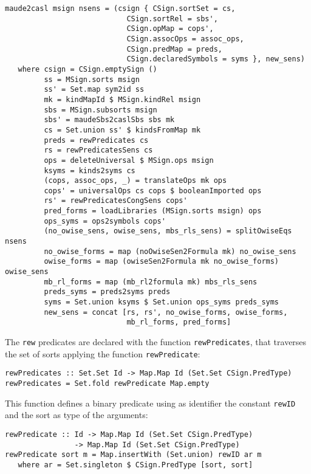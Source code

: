 {\codesize
\begin{verbatim}
maude2casl msign nsens = (csign { CSign.sortSet = cs,
                            CSign.sortRel = sbs',
                            CSign.opMap = cops',
                            CSign.assocOps = assoc_ops,
                            CSign.predMap = preds,
                            CSign.declaredSymbols = syms }, new_sens)
   where csign = CSign.emptySign ()
         ss = MSign.sorts msign
         ss' = Set.map sym2id ss
         mk = kindMapId $ MSign.kindRel msign
         sbs = MSign.subsorts msign
         sbs' = maudeSbs2caslSbs sbs mk
         cs = Set.union ss' $ kindsFromMap mk
         preds = rewPredicates cs
         rs = rewPredicatesSens cs
         ops = deleteUniversal $ MSign.ops msign
         ksyms = kinds2syms cs
         (cops, assoc_ops, _) = translateOps mk ops
         cops' = universalOps cs cops $ booleanImported ops
         rs' = rewPredicatesCongSens cops'
         pred_forms = loadLibraries (MSign.sorts msign) ops
         ops_syms = ops2symbols cops'
         (no_owise_sens, owise_sens, mbs_rls_sens) = splitOwiseEqs nsens
         no_owise_forms = map (noOwiseSen2Formula mk) no_owise_sens
         owise_forms = map (owiseSen2Formula mk no_owise_forms) owise_sens
         mb_rl_forms = map (mb_rl2formula mk) mbs_rls_sens
         preds_syms = preds2syms preds
         syms = Set.union ksyms $ Set.union ops_syms preds_syms
         new_sens = concat [rs, rs', no_owise_forms, owise_forms,
                            mb_rl_forms, pred_forms]
\end{verbatim}
}

The \verb"rew" predicates are declared with the function
\verb"rewPredicates", that traverses the set of sorts applying
the function \verb"rewPredicate":

{\codesize
\begin{verbatim}
rewPredicates :: Set.Set Id -> Map.Map Id (Set.Set CSign.PredType)
rewPredicates = Set.fold rewPredicate Map.empty
\end{verbatim}
}

This function defines a binary predicate using as identifier the constant
\verb"rewID" and the sort as type of the arguments:

{\codesize
\begin{verbatim}
rewPredicate :: Id -> Map.Map Id (Set.Set CSign.PredType)
                -> Map.Map Id (Set.Set CSign.PredType)
rewPredicate sort m = Map.insertWith (Set.union) rewID ar m
   where ar = Set.singleton $ CSign.PredType [sort, sort]
\end{verbatim}
}

